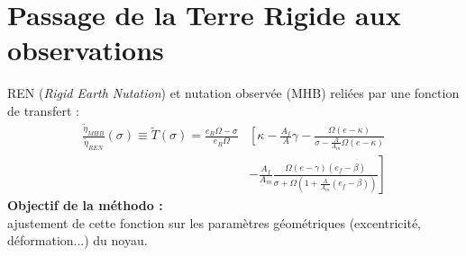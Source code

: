 \section{Passage de la Terre Rigide aux observations}

\begin{frame}
   REN (\textit{Rigid Earth Nutation}) et nutation observée (MHB) reliées par une fonction de transfert :
   \begin{align*}
     \frac{\tilde{\eta}_{MHB}}{\tilde{\eta}_{REN}}(\sigma) 
     \equiv
     \tilde{T}(\sigma) 
     = \frac{e_R\Omega-\sigma}{e_R\Omega} &\left[ \kappa - \frac{A_f}{A}\gamma\right.- \frac{\Omega(e-\kappa)}{\sigma-\frac{A}{A_m}\Omega(e-\kappa)}\\
     &-\left. \frac{A_f}{A_m} \frac{\Omega (e-\gamma)(e_f-\beta)}{\sigma + \Omega(1+ \frac{A}{A_m}(e_f-\beta))}\right]
   \end{align*}
   	 \textbf{Objectif de la méthodo :} 
   	\\ajustement de cette fonction sur les paramètres géométriques (excentricité, déformation...) du noyau. 
\end{frame}

